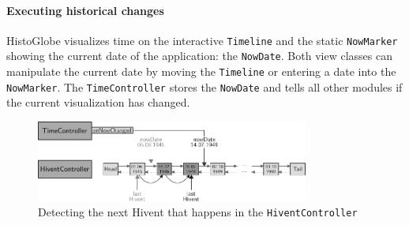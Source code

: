 
\paragraph{Executing historical changes} %
\label{par:executing_historical_changes}

HistoGlobe visualizes time on the interactive \texttt{Timeline} and the static \texttt{NowMarker} showing the current date of the application: the \texttt{NowDate}. Both view classes can manipulate the current date by moving the \texttt{Timeline} or entering a date into the \texttt{NowMarker}. The \texttt{TimeController} stores the \texttt{NowDate} and tells all other modules if the current visualization has changed.

\begin{figure}[ht]
  \vspace{1em}
  \centering
  \includegraphics[width=0.8\textwidth]{graphics/development/application/hivent_controller}
  \caption{Detecting the next Hivent that happens in the \texttt{HiventController}}
  \label{fig:hivent_controller}
\end{figure}


